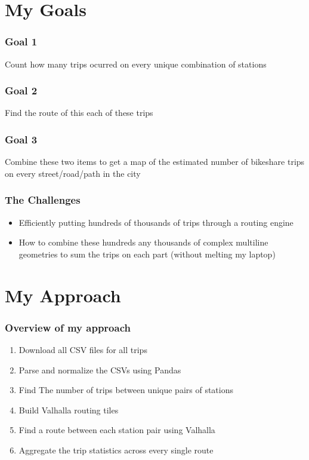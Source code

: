 \documentclass{beamer}
\begin{document}
\section{My Goals}
\begin{frame}
    \frametitle{Goal 1}

    Count how many trips ocurred on every unique combination of stations

\end{frame}

\begin{frame}
    \frametitle{Goal 2}

    Find the route of this each of these trips

\end{frame}
\begin{frame}
    \frametitle{Goal 3}
    Combine these two items to get a map of the estimated number of bikeshare trips on every street/road/path in the city
\end{frame}


\begin{frame}
    \frametitle{The Challenges}
    \begin{itemize}
        \item Efficiently putting hundreds of thousands of trips through a routing engine
        \item How to combine these hundreds any thousands of complex multiline geometries to sum the trips on each part (without melting my laptop)
    \end{itemize}
\end{frame}

\section{My Approach}

\begin{frame}
    \frametitle{Overview of my approach}
    \begin{enumerate}
        \item Download all CSV files for all trips
        \item Parse and normalize the CSVs using Pandas
        \item Find The number of trips between unique pairs of stations
        \item Build Valhalla routing tiles
        \item Find a route between each station pair using Valhalla
        \item Aggregate the trip statistics across every single route
    \end{enumerate}
\end{frame}
\end{document}
